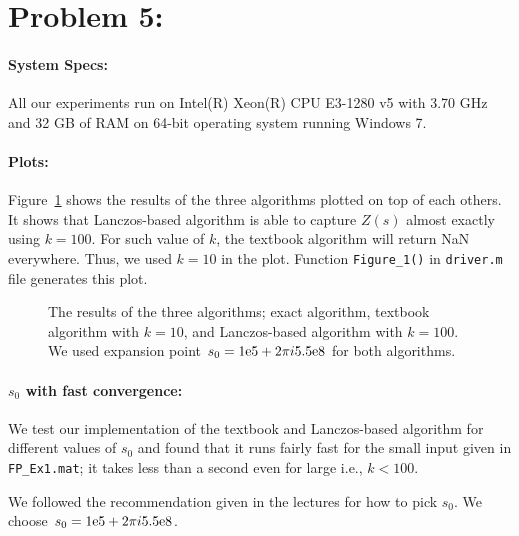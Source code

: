 \section*{Problem 5:}
\paragraph{System Specs:} All our experiments run on Intel(R) Xeon(R) CPU E3-1280 v5 with 3.70 GHz and 32 GB of RAM on 64-bit operating system running Windows 7. 

\paragraph{Plots:} Figure~\ref{fig:all} shows the results of the three algorithms plotted on top of each others. It shows that Lanczos-based algorithm is able to capture $Z(s)$ almost exactly using $k=100$. For such value of $k$, the textbook algorithm will return NaN everywhere. Thus, we used $k=10$ in the plot. Function \texttt{Figure\_1()} in \texttt{driver.m} file generates this plot. 

\begin{figure}[!tbh]
\centering        
   \caption{The results of the three algorithms; exact algorithm, textbook algorithm with $k=10$, and Lanczos-based algorithm with $k=100$. We used expansion point $s_{0} = {1}\mathrm{e}{5} + 2\pi i {5.5}\mathrm{e}{8}$ for both algorithms.   }
   \label{fig:all}
\end{figure}

\paragraph{$s_0$ with fast convergence:} We test our implementation of the textbook and Lanczos-based algorithm for different values of $s_{0}$ and found that it runs fairly fast for the small input given in \texttt{FP\_Ex1.mat}; it takes less than a second even for large i.e., $k < 100$. 

We followed the recommendation given in the lectures for how to pick $s_{0}$. We choose $s_{0} = {1}\mathrm{e}{5} + 2\pi i {5.5}\mathrm{e}{8} $. 

